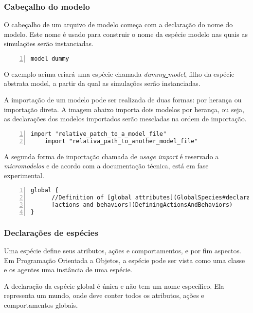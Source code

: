 \subsubsection{Cabeçalho do modelo}

O cabeçalho de um arquivo de modelo começa com a declaração do nome do modelo. Este nome é usado para construir o nome da espécie modelo nas quais as simulações serão instanciadas.

\begin{lstlisting}[numbers=left, caption={Código}]
    model dummy
\end{lstlisting}

O exemplo acima criará uma espécie chamada \textit{dummy\underline{ }model}, filho da espécie abstrata model, a partir da qual as simulações serão instanciadas. 

A importação de um modelo pode ser realizada de duas formas: por herança ou importação direta. A imagem abaixo importa dois modelos por herança, ou seja, as declarações dos modelos importados serão mescladas na ordem de importação.

\begin{lstlisting}[numbers=left, caption={Código}]
    import "relative_patch_to_a_model_file"
    import "relativa_path_to_another_model_file"
\end{lstlisting}

A segunda forma de importação chamada de \textit{usage import } é reservado a \textit{micromodelos} e de acordo com a documentação técnica, está em fase experimental.

\begin{lstlisting}[numbers=left, caption={Código}]
    global {
      //Definition of [global attributes](GlobalSpecies#declaration), 
      [actions and behaviors](DefiningActionsAndBehaviors)
}
\end{lstlisting}




\subsubsection{Declarações de espécies}

Uma espécie define seus atributos, ações e comportamentos, e por fim aspectos. Em Programação Orientada a Objetos, a espécie pode ser vista como uma classe e os agentes uma instância de uma espécie. 

A declaração da espécie global é única e não tem um nome específico. Ela representa um mundo, onde deve conter todos os atributos, ações e comportamentos globais.

